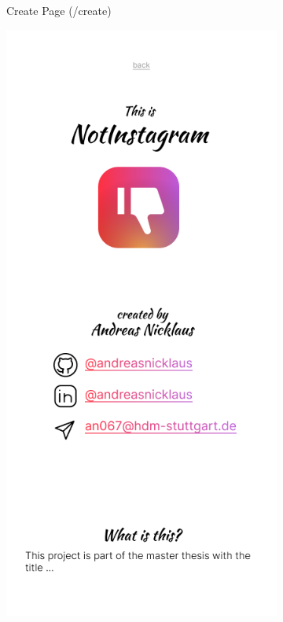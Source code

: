 \documentclass[a4paper, 10pt]{article}
\begin{document}
\begin{figure}[ht!]
\begin{subfigure}{0.49\linewidth}
\begin{center}
    \end{center}
    \caption{Create Page (/create)}\label{subfig:create}
  \end{subfigure}
  \begin{subfigure}{0.49\linewidth}
    \begin{center}
      \includegraphics[width=\linewidth, height=0.3\textheight, keepaspectratio]{img/ig-clone/Informationsseite.png}

\end{center}
\end{subfigure}
\end{figure}
\end{document}
